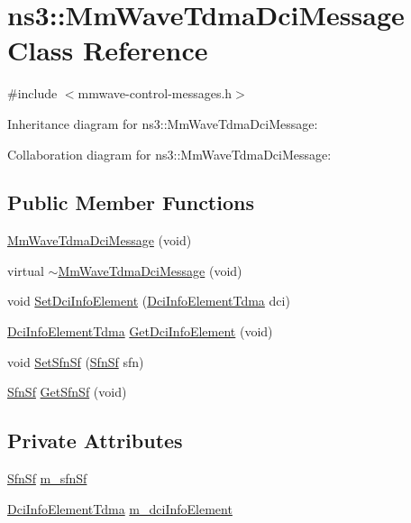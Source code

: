 \hypertarget{classns3_1_1MmWaveTdmaDciMessage}{}\section{ns3\+:\+:Mm\+Wave\+Tdma\+Dci\+Message Class Reference}
\label{classns3_1_1MmWaveTdmaDciMessage}


{\ttfamily \#include $<$mmwave-\/control-\/messages.\+h$>$}



Inheritance diagram for ns3\+:\+:Mm\+Wave\+Tdma\+Dci\+Message\+:


Collaboration diagram for ns3\+:\+:Mm\+Wave\+Tdma\+Dci\+Message\+:
\subsection*{Public Member Functions}
\begin{DoxyCompactItemize}
\item 
\hyperlink{classns3_1_1MmWaveTdmaDciMessage_a737eba27cd555e68bd878a4b9e5a9d6e}{Mm\+Wave\+Tdma\+Dci\+Message} (void)
\item 
virtual \hyperlink{classns3_1_1MmWaveTdmaDciMessage_a9fab26ad180d28fb7adf5674a4a2aaae}{$\sim$\+Mm\+Wave\+Tdma\+Dci\+Message} (void)
\item 
void \hyperlink{classns3_1_1MmWaveTdmaDciMessage_a72f41bf3b482f843595c8ae1f17cee35}{Set\+Dci\+Info\+Element} (\hyperlink{structns3_1_1DciInfoElementTdma}{Dci\+Info\+Element\+Tdma} dci)
\item 
\hyperlink{structns3_1_1DciInfoElementTdma}{Dci\+Info\+Element\+Tdma} \hyperlink{classns3_1_1MmWaveTdmaDciMessage_a5a62b21b4655cda0492b9404e063271f}{Get\+Dci\+Info\+Element} (void)
\item 
void \hyperlink{classns3_1_1MmWaveTdmaDciMessage_a8300fc29b5363a13657dfd757cf996c4}{Set\+Sfn\+Sf} (\hyperlink{structns3_1_1SfnSf}{Sfn\+Sf} sfn)
\item 
\hyperlink{structns3_1_1SfnSf}{Sfn\+Sf} \hyperlink{classns3_1_1MmWaveTdmaDciMessage_a3e4a18fd2d2f52f28a99d7d089361edc}{Get\+Sfn\+Sf} (void)
\end{DoxyCompactItemize}
\subsection*{Private Attributes}
\begin{DoxyCompactItemize}
\item 
\hyperlink{structns3_1_1SfnSf}{Sfn\+Sf} \hyperlink{classns3_1_1MmWaveTdmaDciMessage_aa95052e3260286465e75313247709900}{m\+\_\+sfn\+Sf}
\item 
\hyperlink{structns3_1_1DciInfoElementTdma}{Dci\+Info\+Element\+Tdma} \hyperlink{classns3_1_1MmWaveTdmaDciMessage_a3c28eae5695ce946b5979e253341fbec}{m\+\_\+dci\+Info\+Element}
\end{DoxyCompactItemize}
